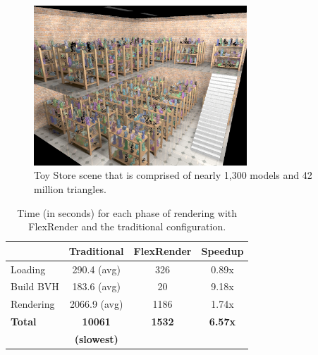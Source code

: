 \documentclass[a4paper,twoside]{article}
\begin{document}
\begin{figure}[h!]
    \centering
    \includegraphics[width=80mm]{showoff/toystore.png}
    \caption{Toy Store scene that is comprised of nearly 1,300 models and 42 million triangles.}
    \label{fig:sotoystore}
\end{figure}



\begin{table}
\begin{center}
\begin{tabular}{|l||c|c|c|}
    \hline
    & Traditional & FlexRender & Speedup \\
    \hline
    \hline
    Loading & 290.4 (avg) & 326 & 0.89x \\
    \hline
    Build BVH & 183.6 (avg) & 20 & 9.18x \\
    \hline
    Rendering & 2066.9 (avg) & 1186 & 1.74x \\
    \hline
    \hline
    \textbf{Total} & \textbf{10061} & \textbf{1532} & \textbf{6.57x} \\
    & \textbf{ (slowest)} & &\\
    \hline
    \hline
\end{tabular}
\caption{Time (in seconds) for each phase of rendering with FlexRender and the traditional configuration.}
\label{tb:flexrendertimes}
\end{center}
\end{table}
\end{document}
